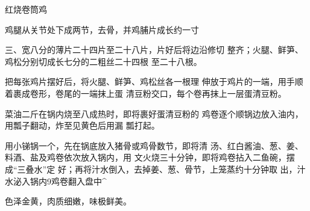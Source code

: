 \begin{recipe}{红烧卷筒鸡}

\ingredients




\cooking

\step 鸡腿从关节处下成两节，去骨，并鸡脯片成长约一寸

三、宽八分的薄片二十四片至二十八片，片好后将边沿修切 整齐；火腿、鲜笋、鸡松分别切成长七分的二粗丝二十四根 至二十八根。

把每张鸡片摆好后，将火腿、鲜笋、鸡松丝各一根理 伸放于鸡片的一端，用手顺着裹成卷形，卷尾的一端抹上蛋 清豆粉交口，每个卷再抹上一层蛋清豆粉。

\step 菜油二斤在锅内烧至八成热时，即将裹好蛋清豆粉的 鸡卷逐个顺锅边放入油内，用瓢子翻动，炸至见黄色后用漏 瓢打起。

\step 用小锑锅一个，先在锅底放入猪骨或鸡骨数节，即将清 汤、红白酱油、葱、姜、料酒、盐及鸡卷依次放入锅内，用 文火烧三十分钟，即将鸡卷拈入二鱼碗，摆成“三叠水”定 好；再将汁水倒入，去掉姜、葱、骨节，上笼蒸约十分钟取 出，汁水泌入锅内9鸡卷翻入盘中^

\notes

色泽金黄，肉质细嫩，味极鲜美。

\end{recipe}

